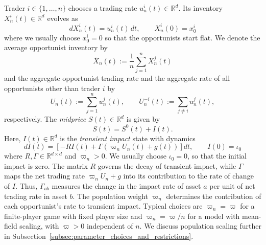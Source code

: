 \documentclass[12pt]{article}
\numberwithin{equation}{section}
\theoremstyle{definition}
\begin{document}
Trader \(i\in\{1,\dots,n\}\) chooses a trading rate
\(u_n^i(t)\in\mathbb R^d\). Its inventory \(X_n^i(t)\in\mathbb R^d\) evolves as
\begin{equation}\label{eq:inventory_dynamics}
    dX_n^i(t)=u_n^i(t)\,dt,
    \qquad
    X_n^i(0)=x_0^i
\end{equation}
where we usually choose \(x_0^i=0\) so that the opportunists start flat.
We denote the average opportunist inventory by
\begin{equation}\label{eq:average_opportunist_inventory}
\bar X_n(t):=\frac{1}{n}\sum_{j=1}^n X_n^j(t)
\end{equation}
and the aggregate opportunist trading rate and the aggregate
rate of all opportunists other than trader \(i\) by
\begin{equation}\label{eq:aggregate_opportunist_rates}
U_n(t):=\sum_{j=1}^n u_n^j(t),
\qquad
U_n^{-i}(t):=\sum_{j\ne i}u_n^j(t),
\end{equation}
respectively. The \emph{midprice} \(S(t)\in\mathbb{R}^d\) is given by
\begin{equation}\label{eq:midprice}
S(t)=S^0(t)+I(t).
\end{equation}
Here, \(I(t)\in\mathbb R^d\) is the \emph{transient impact} state with dynamics
\begin{equation}\label{eq:transient_impact}
dI(t)
=
\left[
-R I(t)
+\Gamma\left(\varpi_n U_n(t)+g(t)\right)
\right]dt,
\qquad
I(0)=\iota_0
\end{equation}
where \(R, \Gamma\in\mathbb{R}^{d\times d}\) and \(\varpi_n>0\).
We usually choose \(\iota_0=0\), so that the initial impact is zero.
The matrix \(R\) governs the decay of transient impact, while \(\Gamma\) maps
the net trading rate \(\varpi_nU_n+g\) into its contribution to the rate of
change of \(I\). Thus, \(\Gamma_{ab}\) measures the change in the impact rate
of asset \(a\) per unit of net trading rate in asset \(b\). The population
weight \(\varpi_n\) determines the contribution of each opportunist's rate
to transient impact. Typical choices are \(\varpi_n=\varpi\) for a finite-player
game with fixed player size and \(\varpi_n=\varpi/n\) for a model with mean-field scaling,
with \(\varpi>0\) independent of \(n\). We discuss population scaling further in
Subsection~\ref{subsec:parameter_choices_and_restrictions}.
\end{document}
